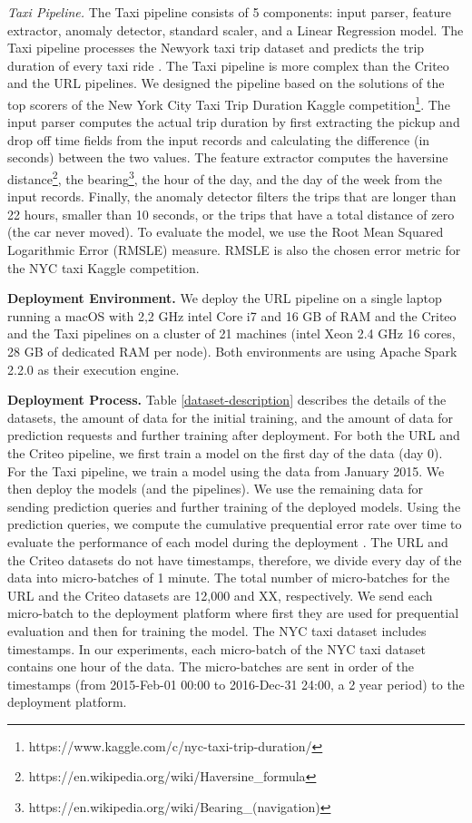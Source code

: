 \textit{Taxi Pipeline.}
The Taxi pipeline consists of 5 components: input parser, feature extractor, anomaly detector, standard scaler, and a Linear Regression model.
The Taxi pipeline processes the Newyork taxi trip dataset and predicts the trip duration of every taxi ride \cite{newyork-taxi}. 
The Taxi pipeline is more complex than the Criteo and the URL pipelines. 
We designed the pipeline based on the solutions of the top scorers of the New York City Taxi Trip Duration Kaggle competition\footnote{https://www.kaggle.com/c/nyc-taxi-trip-duration/}. 
The input parser computes the actual trip duration by first extracting the pickup and drop off time fields from the input records and calculating the difference (in seconds) between the two values.
The feature extractor computes the haversine distance\footnote{https://en.wikipedia.org/wiki/Haversine\_formula}, the bearing\footnote{https://en.wikipedia.org/wiki/Bearing\_(navigation)}, the hour of the day, and the day of the week from the input records. 
Finally, the anomaly detector filters the trips that are longer than 22 hours, smaller than 10 seconds, or the trips that have a total distance of zero (the car never moved).
To evaluate the model, we use the Root Mean Squared Logarithmic Error (RMSLE) measure.
RMSLE is also the chosen error metric for the NYC taxi Kaggle competition.

\textbf{Deployment Environment. }
We deploy the URL pipeline on a single laptop running a macOS with 2,2 GHz intel Core i7 and 16 GB of RAM and the Criteo and the Taxi pipelines on a cluster of 21 machines (intel Xeon 2.4 GHz 16 cores, 28 GB of dedicated RAM per node).
Both environments are using Apache Spark 2.2.0 as their execution engine.

\textbf{Deployment Process. }
Table \ref{dataset-description} describes the details of the datasets, the amount of data for the initial training, and the amount of data for prediction requests and further training after deployment. 
For both the URL and the Criteo pipeline, we first train a model on the first day of the data (day 0).
For the Taxi pipeline, we train a model using the data from January 2015.
We then deploy the models (and the pipelines).
We use the remaining data for sending prediction queries and further training of the deployed models.
Using the prediction queries, we compute the cumulative prequential error rate over time to evaluate the performance of each model during the deployment \cite{dawid1984present}.
The URL and the Criteo datasets do not have timestamps, therefore, we divide every day of the data into micro-batches of 1 minute.
The total number of micro-batches for the URL and the Criteo datasets are 12,000 and XX, respectively.
We send each micro-batch to the deployment platform where first they are used for prequential evaluation and then for training the model.
The NYC taxi dataset includes timestamps. 
In our experiments, each micro-batch of the NYC taxi dataset contains one hour of the data. 
The micro-batches are sent in order of the timestamps (from 2015-Feb-01  00:00 to 2016-Dec-31 24:00, a 2 year period) to the deployment platform.

